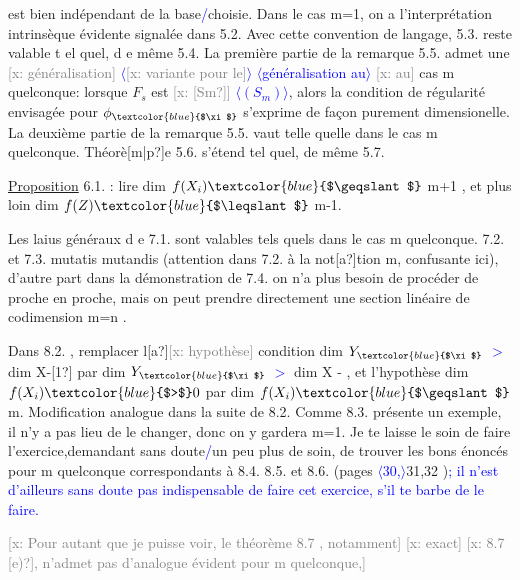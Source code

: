 \documentclass[11pt]{article}
\newcommand{\scanpage}[1]{\par\bigskip\noindent{\small\sffamily[scan #1]}\par}
\newcommand{\mspage}[1]{{\small\sffamily[p.\,#1]}}
\newcommand{\hand}[1]{\textcolor{blue}{#1}}
\let\over\relax
\newcommand{\over}[2]{\textcolor{gray}{#1}\textcolor{blue}{\ensuremath{^{\!\nearrow}}#2}}
\newcommand{\inserted}[2][]{\textcolor{blue}{$\langle$#2$\rangle$}}
\newcommand{\xout}[1]{\textcolor{gray}{[\textsf{x:} #1]}}
\newcommand{\uline}[1]{\underline{#1}}
\newcommand{\unsure}[1]{[#1?]}
\begin{document}
est bien indépendant de la base\hand{/}choisie.  Dans le cas  m=1, on a
l'interprétation intrinsèque évidente signalée dans 5.2.  Avec cette
convention de langage, 5.3.  reste valable t el quel, d e même 5.4.
La première partie de la remarque 5.5.   admet une \xout{généralisation} \inserted[typed]{\xout{variante pour le}}
\inserted[typed]{généralisation au}
\xout{au} cas m quelconque:  lorsque $F_s$  est \xout{\unsure{Sm}} \inserted[typed]{$(S_m)$}, alors la condition de
régularité envisagée pour $\phi_{\hand{$\xi$}}$  s'exprime de façon purement dimensionelle.
La deuxième partie de la remarque 5.5. vaut telle quelle dans le cas
m quelconque.      Théorè\unsure{m|p}e 5.6.  s'étend tel quel,  de même 5.7.

\uline{Proposition} 6.1.  :  lire   dim $f(X_i) \hand{$\geqslant$}$  m+1 ,  et
plus loin   dim $f(Z) \hand{$\leqslant$}$ m-1.

Les laius généraux d e 7.1. sont valables tels quels dans le cas
m quelconque.  7.2. et 7.3.  mutatis mutandis (attention dans 7.2.
à la not\unsure{a}tion m, confusante ici),  d'autre part dans la démonstration
de 7.4. on n'a plus besoin de procéder de proche en proche, mais on
peut prendre directement une section linéaire  de codimension m=n .

Dans 8.2. , remplacer l\unsure{a}\xout{hypothèse} condition    dim $Y_{\hand{$\xi$}}$ \hand{$>$} dim X-\unsure{1}
par  dim $Y_{\hand{$\xi$}}$ \hand{$>$}  dim X  - \over{1}{m} , et l'hypothèse  dim $f(X_i) \hand{$>$} 0$  par
dim $f(X_i) \hand{$\geqslant$}$ m.   Modification analogue dans la suite de 8.2.  Comme
8.3.  présente un exemple, il n'y a pas lieu de le changer, donc on
y gardera m=1.   Je te laisse le soin de faire l'exercice,demandant
sans doute\hand{/}un peu plus de soin, de trouver  les bons énoncés pour m
quelconque correspondants à  8.4.  8.5.  et 8.6.   (pages \inserted{30,}31,32 )\hand{;}
\hand{il n'est d'ailleurs sans doute pas indispensable de}
\hand{faire cet exercice, s'il te barbe de le faire.}

\mspage{70}

\clearpage
\scanpage{25/71}
\mspage{66}

\xout{Pour autant que je puisse voir, le théorème 8.7 , notamment}
\xout{exact}
\xout{8.7 \unsure{e)}, n'admet pas d'analogue évident pour m quelconque,}
\end{document}
